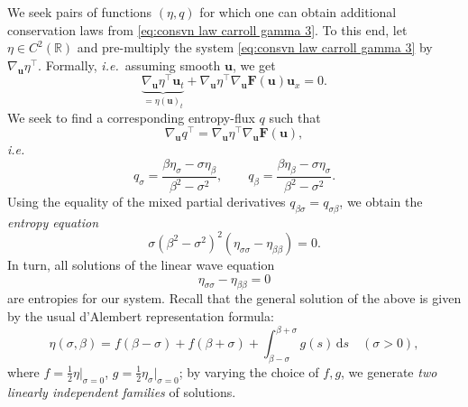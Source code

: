 \documentclass[11pt,a4paper,reqno]{amsart}
\numberwithin{equation}{section}
\theoremstyle{definition}
\theoremstyle{remark}
\newcommand{\bu}{\mathbf{u}}
\newcommand{\bF}{\mathbf{F}}
\renewcommand{\d}{\, \mathrm{d}}
\begin{document}
{We seek pairs of functions $(\eta,q)$ for which one can obtain additional conservation laws from \eqref{eq:consvn law carroll gamma 3}. To this end, let $\eta \in C^2(\mathbb{R})$ and pre-multiply the system \eqref{eq:consvn law carroll gamma 3} by $\nabla_\bu \eta^\intercal$. Formally, \textit{i.e.}~assuming smooth $\bu$, we get 
\begin{equation*}
    \underbrace{\nabla_\bu \eta ^\intercal \bu_t}_{=\eta(\bu)_t} + \nabla_\bu \eta^\intercal \nabla_\bu \bF(\bu) \bu_x = 0. 
\end{equation*}
We seek to find a corresponding entropy-flux $q$ such that 
\begin{equation*}
    \nabla_\bu q^\intercal = \nabla_\bu \eta^\intercal \nabla_\bu \bF(\bu), 
\end{equation*}
\textit{i.e.}
\begin{equation*}
    q_\sigma =  \frac{\beta \eta_\sigma - \sigma \eta_\beta}{\beta^2-\sigma^2}  , \qquad q_\beta = \frac{\beta \eta_\beta - \sigma \eta_\sigma}{\beta^2-\sigma^2}       . 
\end{equation*}
Using the equality of the mixed partial derivatives $q_{\beta \sigma} = q_{\sigma \beta}$, we obtain the \emph{entropy equation} 
\begin{equation}\label{eq:ent eqn}
    \sigma(\beta^2-\sigma^2)^2 (\eta_{\sigma\sigma} - \eta_{\beta\beta}) = 0. 
\end{equation}
In turn, all solutions of the linear wave equation 
\begin{equation*}
    \eta_{\sigma\sigma} - \eta_{\beta \beta} = 0 
\end{equation*}
are entropies for our system. Recall that the general solution of the above is given by the usual d'Alembert representation formula: 
\begin{equation}\label{eq:eta general}
    \eta(\sigma,\beta) = f(\beta-\sigma) + f(\beta+\sigma) + \int_{\beta-\sigma}^{\beta+\sigma} g(s) \d s \quad (\sigma>0),
\end{equation}
where $f = \frac{1}{2}\eta|_{\sigma=0}$, $g = \frac{1}{2}\eta_\sigma|_{\sigma=0}$; by varying the choice of $f,g$, we generate \emph{two linearly independent families} of solutions. 

}
\end{document}
